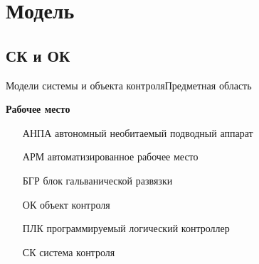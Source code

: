 \section{Модель}\subsection{СК и ОК}
\begin{frame}{Модели системы и объекта контроля}{Предметная область}
    \begin{minipage}[t]{0.57\linewidth}
        \textbf{\tiny Рабочее место}
    \end{minipage}
    \hfill
    \begin{minipage}[t]{0.4\linewidth}
        \begin{itemize}
            \item[АНПА] автономный необитаемый подводный аппарат
            \item[АРМ] автоматизированное рабочее место
            \item[БГР] блок гальванической развязки
            \item[ОК]  объект контроля
            \item[ПЛК] программируемый логический контроллер
            \item[СК]  система контроля            
        \end{itemize}
    \end{minipage}\pause
    \vspace{3pt}
\end{frame}





